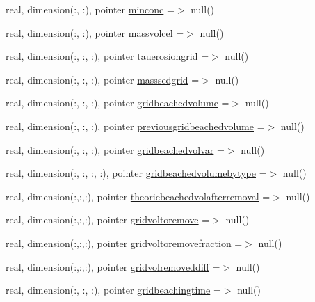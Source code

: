 \begin{DoxyCompactItemize}
\item 
real, dimension(\+:, \+:), pointer \mbox{\hyperlink{structmodulelagrangianglobal_1_1t__lag2euler_abf507d2e2d12f0c54d664be91cd88d09}{minconc}} =$>$ null()
\item 
real, dimension(\+:, \+:), pointer \mbox{\hyperlink{structmodulelagrangianglobal_1_1t__lag2euler_a64f45f0559b915e53df37056792aa351}{massvolcel}} =$>$ null()
\item 
real, dimension(\+:, \+:, \+:), pointer \mbox{\hyperlink{structmodulelagrangianglobal_1_1t__lag2euler_a5abbf83bb8b263aa383f5a35ff1d2010}{tauerosiongrid}} =$>$ null()
\item 
real, dimension(\+:, \+:, \+:), pointer \mbox{\hyperlink{structmodulelagrangianglobal_1_1t__lag2euler_a60dd9d6d922a467c52a03c9fe4e209ad}{masssedgrid}} =$>$ null()
\item 
real, dimension(\+:, \+:, \+:), pointer \mbox{\hyperlink{structmodulelagrangianglobal_1_1t__lag2euler_a7649137706e9723fb96494a3b8c51484}{gridbeachedvolume}} =$>$ null()
\item 
real, dimension(\+:, \+:, \+:), pointer \mbox{\hyperlink{structmodulelagrangianglobal_1_1t__lag2euler_af577eade13c2ee15f5fd7e70f849b04f}{previousgridbeachedvolume}} =$>$ null()
\item 
real, dimension(\+:, \+:, \+:), pointer \mbox{\hyperlink{structmodulelagrangianglobal_1_1t__lag2euler_a1f6d9e347f5495dbfd22c0fd6a0d5667}{gridbeachedvolvar}} =$>$ null()
\item 
real, dimension(\+:, \+:, \+:, \+:), pointer \mbox{\hyperlink{structmodulelagrangianglobal_1_1t__lag2euler_a32a831872d0924125f79d20fa46967f4}{gridbeachedvolumebytype}} =$>$ null()
\item 
real, dimension(\+:,\+:,\+:), pointer \mbox{\hyperlink{structmodulelagrangianglobal_1_1t__lag2euler_a3440625ebe519021f0db339336ecf166}{theoricbeachedvolafterremoval}} =$>$ null()
\item 
real, dimension(\+:,\+:,\+:), pointer \mbox{\hyperlink{structmodulelagrangianglobal_1_1t__lag2euler_ada86cd351be4472fce4ad1f00c26644e}{gridvoltoremove}} =$>$ null()
\item 
real, dimension(\+:,\+:,\+:), pointer \mbox{\hyperlink{structmodulelagrangianglobal_1_1t__lag2euler_a1cdff73a3b02b12df264403fa7cf99c5}{gridvoltoremovefraction}} =$>$ null()
\item 
real, dimension(\+:,\+:,\+:), pointer \mbox{\hyperlink{structmodulelagrangianglobal_1_1t__lag2euler_af42ffaf3a6f4868f2d7669a4b0d5a8f5}{gridvolremoveddiff}} =$>$ null()
\item 
real, dimension(\+:, \+:, \+:), pointer \mbox{\hyperlink{structmodulelagrangianglobal_1_1t__lag2euler_a2c0442d625e9b0fc16b8c469a410af27}{gridbeachingtime}} =$>$ null()
\end{DoxyCompactItemize}


